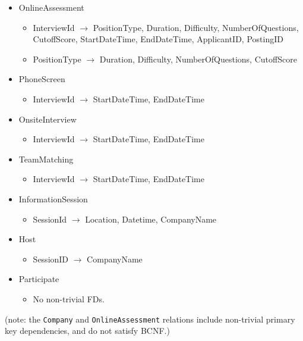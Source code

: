 \begin{itemize}
\begin{itemize}
    \end{itemize}
  \item OnlineAssessment
    \begin{itemize}
      \item InterviewId $ \to $ PositionType, Duration, Difficulty, 
        NumberOfQuestions, CutoffScore, StartDateTime, EndDateTime, ApplicantID, PostingID
      \item PositionType $ \to $ Duration, Difficulty, NumberOfQuestions, CutoffScore
    \end{itemize}
  \item PhoneScreen
    \begin{itemize}
      \item InterviewId $ \to $ StartDateTime, EndDateTime
    \end{itemize}
  \item OnsiteInterview
    \begin{itemize}
      \item InterviewId $ \to $ StartDateTime, EndDateTime
    \end{itemize}
  \item TeamMatching
    \begin{itemize}
      \item InterviewId $ \to $ StartDateTime, EndDateTime
    \end{itemize}
  \item InformationSession
    \begin{itemize}
      \item SessionId $ \to $ Location, Datetime, CompanyName
    \end{itemize}
  \item Host
    \begin{itemize}
      \item SessionID $ \to $ CompanyName
    \end{itemize}
  \item Participate
    \begin{itemize}
      \item No non-trivial FDs.
    \end{itemize}
\end{itemize}

(note: the \texttt{Company} and \texttt{OnlineAssessment} relations include non-trivial primary key dependencies,
and do not satisfy BCNF.)
